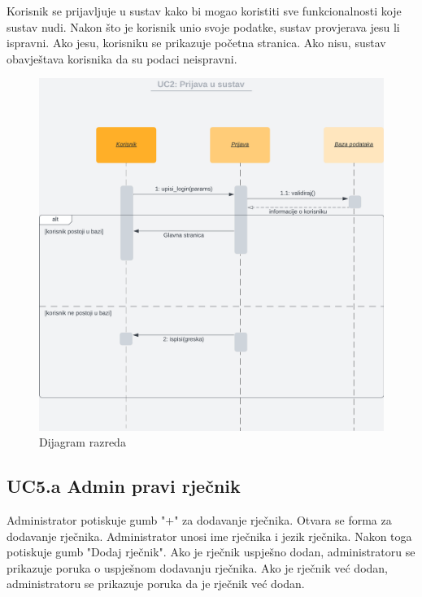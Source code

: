 					Korisnik se prijavljuje u sustav kako bi mogao koristiti sve funkcionalnosti koje sustav nudi. Nakon što je korisnik unio svoje podatke, sustav provjerava jesu li ispravni. Ako jesu, korisniku se prikazuje početna stranica. Ako nisu, sustav obavještava korisnika da su podaci neispravni.\\
					
				\begin{figure}[H]
					\includegraphics[scale=0.5]{dijagrami/UC2.png} 
					\centering
					\caption{Dijagram razreda}
					\label{fig:class_diagram}
				\end{figure}	
				\eject

				\subsection*{UC5.a Admin pravi rječnik}

				Administrator potiskuje gumb "+" za dodavanje rječnika. Otvara se forma za dodavanje rječnika. Administrator unosi ime rječnika i jezik rječnika. Nakon toga potiskuje gumb "Dodaj rječnik". Ako je rječnik uspješno dodan, administratoru se prikazuje poruka o uspješnom dodavanju rječnika. Ako je rječnik već dodan, administratoru se prikazuje poruka da je rječnik već dodan.\\

